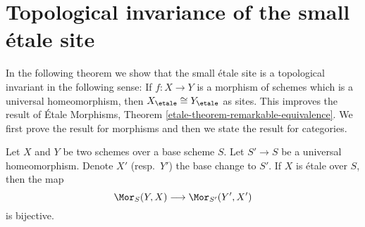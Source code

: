 \section{Topological invariance of the small \'etale site}
\label{section-topological-invariance}

\noindent
In the following theorem we show that the small \'etale site is a topological
invariant in the following sense: If $f : X \to Y$ is a morphism of schemes
which is a universal homeomorphism, then $X_\etale \cong Y_\etale$
as sites. This improves the result of
\'Etale Morphisms, Theorem \ref{etale-theorem-remarkable-equivalence}.
We first prove the result for morphisms and then we state the result
for categories.

\begin{theorem}
\label{theorem-etale-topological}
Let $X$ and $Y$ be two schemes over a base scheme $S$. Let
$S' \to S$ be a universal homeomorphism.
Denote $X'$ (resp.\ $Y'$) the base change to $S'$.
If $X$ is \'etale over $S$, then the map
$$
\Mor_S(Y, X) \longrightarrow \Mor_{S'}(Y', X')
$$
is bijective.
\end{theorem}

